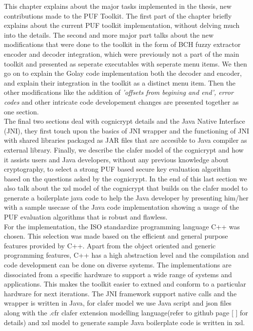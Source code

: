 This chapter explains about the major tasks implemented in the thesis, new contributions made to the PUF Toolkit. The first part of the chapter briefly explains about the current PUF toolkit implementation, without delving much into the details. The second and more major part talks about the new modifications that were done to the toolkit in the form of BCH fuzzy extractor encoder and decoder integration, which were previously not a part of the main toolkit and presented as seperate executables
with seperate menu items. We then go on to explain the Golay code implementation both the decoder and encoder, and explain their integration in the toolkit as a distinct menu item. Then the other modifications like the addition of \emph{'offsets from begining and end', error codes} and other intricate code developement changes are presented together as one section.\\


The final two sections deal with cognicrypt details and the Java Native Interface (JNI), they first touch upon the basics of JNI
wrapper and the functioning of JNI with shared libraries packaged as JAR files that are accesible to Java compiler as external library. Finally, we describe the clafer model of the cognicrypt and how it assists users and Java developers, without any previous knowledge about cryptography, to select a strong PUF based secure key evaluation algorithm based on the questions asked by the cognicrypt. In the end of this last section we also talk about the xsl model of the cognicrypt that builds on
the clafer model to generate a boilerplate java code to help the Java developer by presenting him/her with a sample usecase of the Java code implementation showing a usage of the PUF evaluation algorithms that is robust and flawless.\\

For the implementation, the ISO standardize programming language C++ was chosen. This selection was made based on the efficient and general purpose features provided by C++. Apart from the object oriented and generic programming features, C++ has a high abstraction level and the compilation and code development can be done on diverse systems. The implementations are dissociated from a specific hardware to support a wide range of systems and applications. This makes the toolkit easier
to extned and conform to a particular hardware for next iterations. The JNI framework support native calls and the wrapper is written in Java, for clafer model we use Java script and json files along with the .cfr clafer extension modelling language(refer to github page [ ] for details) and xsl model to generate sample Java boilerplate code is written in xsl.\\

